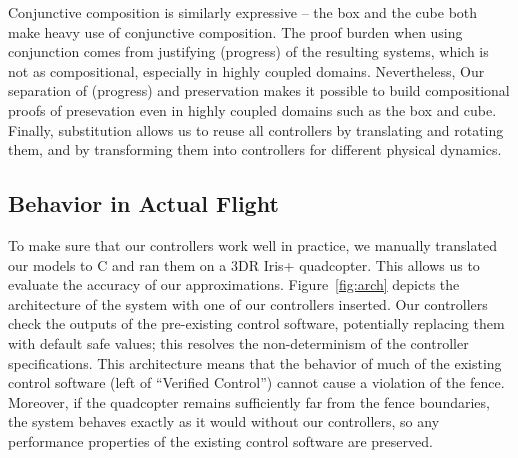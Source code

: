 Conjunctive composition is similarly expressive -- the box and the cube
both make heavy use of conjunctive composition.  The proof burden when
using conjunction comes from justifying \progress{} (progress) of the
resulting systems, which is not as compositional, especially in highly
coupled domains.  Nevertheless, Our separation of \progress{} (progress)
and preservation makes it possible to build compositional proofs of
presevation even in highly coupled domains such as the box and cube.
Finally, substitution allows us to reuse all controllers by translating and
rotating them, and by transforming them into controllers for different
physical dynamics.

\subsection{Behavior in Actual Flight}
\label{sec:flight}
To make sure that our controllers work well in practice, we manually
translated our models to C and ran them on a 3DR Iris+ quadcopter.  This
allows us to evaluate the accuracy of our approximations.
Figure~\ref{fig:arch} depicts the architecture of the system with one of
our controllers inserted.  Our controllers check the outputs of the
pre-existing control software, potentially replacing them with default safe
values; this resolves the non-determinism of the controller specifications.
This architecture means that the behavior of much of the existing control
software (left of ``Verified Control'') cannot cause a violation of the
fence.  Moreover, if the quadcopter remains sufficiently far from the fence
boundaries, the system behaves exactly as it would without our controllers,
so any performance properties of the existing control software are
preserved.

